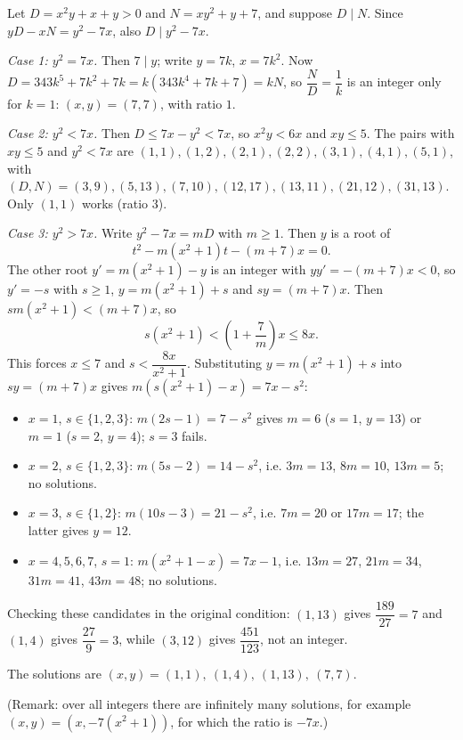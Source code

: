 Let $D=x^2y+x+y>0$ and $N=xy^2+y+7$, and suppose $D\mid N$. Since $yD-xN=y^2-7x$, also $D\mid y^2-7x$.

\emph{Case 1: $y^2=7x$.} Then $7\mid y$; write $y=7k$, $x=7k^2$. Now $D=343k^5+7k^2+7k=k\left(343k^4+7k+7\right)=kN$, so $\dfrac ND=\dfrac1k$ is an integer only for $k=1$: $(x,y)=(7,7)$, with ratio $1$.

\emph{Case 2: $y^2<7x$.} Then $D\le7x-y^2<7x$, so $x^2y<6x$ and $xy\le5$. The pairs with $xy\le5$ and $y^2<7x$ are $(1,1),(1,2),(2,1),(2,2),(3,1),(4,1),(5,1)$, with $(D,N)=(3,9),(5,13),(7,10),(12,17),(13,11),(21,12),(31,13)$. Only $(1,1)$ works (ratio $3$).

\emph{Case 3: $y^2>7x$.} Write $y^2-7x=mD$ with $m\ge1$. Then $y$ is a root of
\[t^2-m\left(x^2+1\right)t-(m+7)x=0.\]
The other root $y'=m\left(x^2+1\right)-y$ is an integer with $yy'=-(m+7)x<0$, so $y'=-s$ with $s\ge1$, $y=m\left(x^2+1\right)+s$ and $sy=(m+7)x$. Then $sm\left(x^2+1\right)<(m+7)x$, so
\[s\left(x^2+1\right)<\left(1+\dfrac7m\right)x\le8x.\]
This forces $x\le7$ and $s<\dfrac{8x}{x^2+1}$. Substituting $y=m\left(x^2+1\right)+s$ into $sy=(m+7)x$ gives $m\left(s\left(x^2+1\right)-x\right)=7x-s^2$:
\begin{itemize}
\item $x=1$, $s\in\{1,2,3\}$: $m(2s-1)=7-s^2$ gives $m=6$ ($s=1$, $y=13$) or $m=1$ ($s=2$, $y=4$); $s=3$ fails.
\item $x=2$, $s\in\{1,2,3\}$: $m(5s-2)=14-s^2$, i.e. $3m=13$, $8m=10$, $13m=5$; no solutions.
\item $x=3$, $s\in\{1,2\}$: $m(10s-3)=21-s^2$, i.e. $7m=20$ or $17m=17$; the latter gives $y=12$.
\item $x=4,5,6,7$, $s=1$: $m(x^2+1-x)=7x-1$, i.e. $13m=27$, $21m=34$, $31m=41$, $43m=48$; no solutions.
\end{itemize}
Checking these candidates in the original condition: $(1,13)$ gives $\dfrac{189}{27}=7$ and $(1,4)$ gives $\dfrac{27}9=3$, while $(3,12)$ gives $\dfrac{451}{123}$, not an integer.

The solutions are $\boxed{(x,y)=(1,1),\ (1,4),\ (1,13),\ (7,7)}$.

(Remark: over all integers there are infinitely many solutions, for example $(x,y)=\left(x,-7\left(x^2+1\right)\right)$, for which the ratio is $-7x$.)
